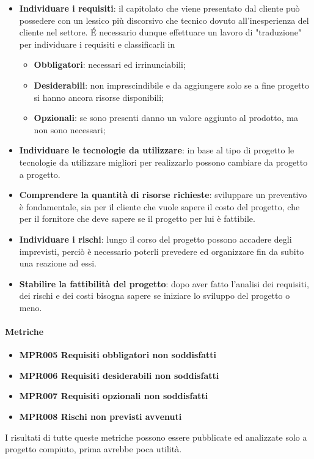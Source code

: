 		\begin{itemize}
			\item \textbf{Individuare i requisiti}: il capitolato che viene presentato dal cliente può possedere con un lessico più discorsivo che tecnico dovuto all'inesperienza del cliente nel settore. \'E necessario dunque effettuare un lavoro di "traduzione" per individuare i requisiti e classificarli in
			\begin{itemize}
				\item \textbf{Obbligatori}: necessari ed irrinunciabili;
				\item \textbf{Desiderabili}: non imprescindibile e da aggiungere solo se a fine progetto si hanno ancora risorse disponibili;  
				\item \textbf{Opzionali}: se sono presenti danno un valore aggiunto al prodotto, ma non sono necessari;
			\end{itemize}
			\item \textbf{Individuare le tecnologie da utilizzare}: in base al tipo di progetto le tecnologie da utilizzare migliori per realizzarlo possono cambiare da progetto a progetto.
			\item \textbf{Comprendere la quantità di risorse richieste}: sviluppare un preventivo è fondamentale, sia per il cliente che vuole sapere il costo del progetto, che per il fornitore che deve sapere se il progetto per lui è fattibile.
			\item \textbf{Individuare i rischi}: lungo il corso del progetto possono accadere degli imprevisti, perciò è necessario poterli prevedere ed organizzare fin da subito una reazione ad essi.
			\item \textbf{Stabilire la fattibilità del progetto}: dopo aver fatto l'analisi dei requisiti, dei rischi e dei costi bisogna sapere se iniziare lo sviluppo del progetto o meno.
		\end{itemize}
		
		\paragraph*{Metriche}
		
		\begin{itemize}
			\item \textbf{MPR005 Requisiti obbligatori non soddisfatti}
			\item \textbf{MPR006 Requisiti desiderabili non soddisfatti}
			\item \textbf{MPR007 Requisiti opzionali non soddisfatti}
			\item \textbf{MPR008 Rischi non previsti avvenuti}
		\end{itemize}
		I risultati di tutte queste metriche possono essere pubblicate ed analizzate solo a progetto compiuto, prima avrebbe poca utilità. 
	
